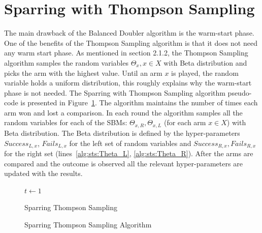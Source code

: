 \documentclass[MSc,beforeExam]{iitcsthesis}
\begin{document}
		\section{Sparring with Thompson Sampling}
	The main drawback of the Balanced Doubler algorithm is the warm-start phase.
	One of the benefits of the Thompson Sampling algorithm is that it does not need any warm start phase.
	As mentioned in section 2.1.2, the Thompson Sampling algorithm samples the random variables $\Theta_x, x\in X$ with Beta distribution and picks the arm with the highest value.
	Until an arm $x$ is played, the random variable holds a uniform distribution, this roughly explains why the warm-start phase is not needed.
		The Sparring with Thompson Sampling algorithm pseudo-code is presented in Figure~\ref{algo_SparringTS}.
		The algorithm maintains the number of times each arm won and lost a comparison.
		In each round the algorithm samples all the random variables for each of the SBMs: $\Theta_{x,R}, \Theta_{x,L}$ (for each arm $x \in X$) with Beta distribution. 
		The Beta distribution is defined by the hyper-parameters $Success_{L,x}$, $Fails_{L,x}$ for the left set of random variables and $Success_{R,x}, Fails_{R,x}$ for the right set (lines~\ref{alg:sts:Theta_L}, \ref{alg:sts:Theta_R}).
		After the arms are compared and the outcome is observed all the relevant hyper-parameters are updated with the results.
		
	\begin{figure}[h]
	\IncMargin{1em}
		\begin{algorithm}[H]
		
		\BlankLine
		$t\leftarrow 1$\\
			\caption{Sparring Thompson Sampling}
		\end{algorithm}
		\caption{Sparring Thompson Sampling Algorithm}\label{algo_SparringTS}
	\end{figure}
	
\end{document}
